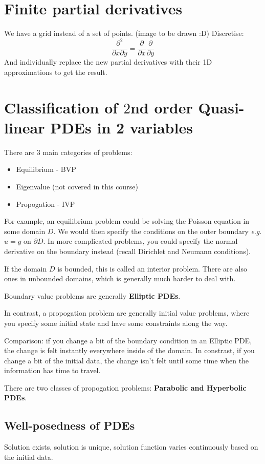 \documentclass{article}
\numberwithin{equation}{section}
\theoremstyle{definition}
\newcommand{\eg}{\textit{e}.\textit{g}.}
\newcommand{\pp}[2]{\frac{\partial #1}{\partial #2}}
\begin{document}
\section{Finite partial derivatives}
We have a grid instead of a set of points.
(image to be drawn :D)
Discretise:
\begin{equation}
    \frac{\partial^2 }{\partial x \partial y}= \pp{}{x} \pp{}{y}
\end{equation}
And individually replace the new partial derivatives with their 1D approximations to get the result.

\section{Classification of $2$nd order Quasi-linear PDEs in 2 variables}

There are 3 main categories of problems:
\begin{itemize}
    \item Equilibrium - BVP
    \item Eigenvalue (not covered in this course)
    \item Propogation - IVP
\end{itemize}
For example, an equilibrium problem could be solving the Poisson equation in some domain $D$. We would then specify the conditions on the outer boundary \eg $u = g$ on $\partial D$. In more complicated problems, you could specify the normal derivative on the boundary instead (recall Dirichlet and Neumann conditions).

If the domain $D$ is bounded, this is called an interior problem. There are also ones in unbounded domains, which is generally much harder to deal with.

Boundary value problems are generally \textbf{Elliptic PDEs}.

In contrast, a propogation problem are generally initial value problems, where you specify some initial state and have some constraints along the way.


Comparison: if you change a bit of the boundary condition in an Elliptic PDE, the change is felt instantly everywhere inside of the domain. In constrast, if you change a bit of the initial data, the change isn't felt until some time when the information has time to travel.

There are two classes of propogation problems: \textbf{Parabolic and Hyperbolic PDEs}.

\subsection{Well-posedness of PDEs}
Solution exists, solution is unique, solution function varies continuously based on the initial data.
\end{document}
